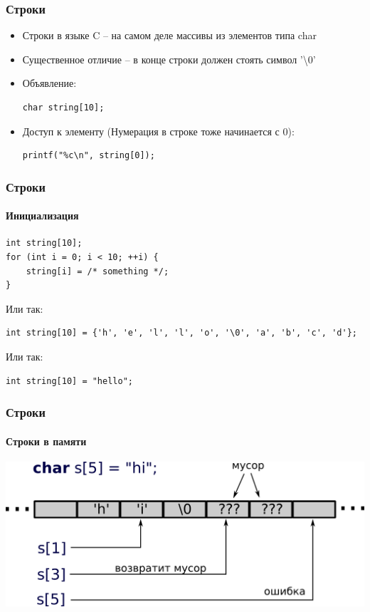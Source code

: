 \documentclass[12pt,pdf,hyperref={unicode}]{beamer}
\begin{document}
\iffalse
\begin{frame}[fragile]
\frametitle{Строки} 
\begin{itemize}
\item Строки в языке C -- на самом деле массивы из элементов типа char
\item Существенное отличие -- в конце строки должен стоять символ '\textbackslash 0'
\item Объявление:
\begin{lstlisting}
char string[10];
\end{lstlisting}
\item Доступ к элементу
(Нумерация в строке тоже начинается с 0):\\
\begin{lstlisting}
printf("%c\n", string[0]);
\end{lstlisting}
\end{itemize}
\end{frame}


\begin{frame}[fragile]
\frametitle{Строки} 
\framesubtitle{Инициализация}
\begin{lstlisting}
int string[10];
for (int i = 0; i < 10; ++i) {
    string[i] = /* something */;
}
\end{lstlisting}
Или так:\\
\begin{lstlisting}
int string[10] = {'h', 'e', 'l', 'l', 'o', '\0', 'a', 'b', 'c', 'd'};
\end{lstlisting}
Или так:\\
\begin{lstlisting}
int string[10] = "hello";
\end{lstlisting}
\end{frame}

\begin{frame}[fragile]
\frametitle{Строки} 
\framesubtitle{Строки в памяти}
\begin{center}
\includegraphics[width=0.95\linewidth]{images/string_in_memory.png}
\end{center}
\end{frame}
\end{document}
